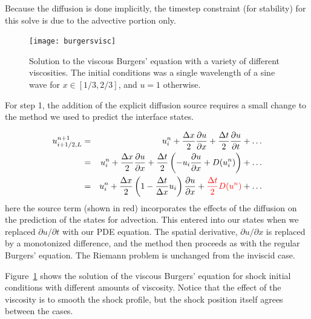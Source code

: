 Because the diffusion is done implicitly, the timestep constraint (for
stability) for this solve is due to the advective portion only.

\begin{figure}[t]
\centering
\texttt{[image: burgersvisc]}
\caption[Viscous Burgers' equation solution]
  {\label{fig:viscburger} Solution to the viscous Burgers' equation
  with a variety of different viscosities.  The initial conditions was
  a single wavelength of a sine wave for $x \in [1/3,2/3]$, and $u = 1$
  otherwise. \\
  }
\end{figure}

For step 1, the addition of the explicit diffusion source requires
a small change to the method we used to predict the interface states.

\begin{eqnarray}
u^{n+1}_{i+1/2,L} &=& u^n_i + \frac{\Delta x}{2} \frac{\partial u}{\partial x}
                        + \frac{\Delta t}{2} \frac{\partial u}{\partial t} + \ldots \\
                &=& u^n_i + \frac{\Delta x}{2} \frac{\partial u}{\partial x}
                        + \frac{\Delta t}{2} \left (-u_i \frac{\partial u}{\partial x} + D(u^n_i) \right ) + \ldots \\
                &=& u^n_i + \frac{\Delta x}{2} \left ( 1 - \frac{\Delta t}{\Delta x}u_i \right ) \frac{\partial u}{\partial x} + {\color{red} \frac{\Delta t}{2} D(u^n) } + \ldots
\end{eqnarray}
here the source term (shown in red) incorporates the effects of the
diffusion on the prediction of the states for advection.  This entered
into our states when we replaced $\partial u/\partial t$ with our PDE
equation.  The spatial derivative, $\partial u/\partial x$ is replaced
by a monotonized difference, and the method then proceeds as with the
regular Burgers' equation.  The Riemann problem is unchanged from the
inviscid case.

Figure~\ref{fig:viscburger} shows the solution of the viscous Burgers'
equation for shock initial conditions with different amounts of
viscosity.  Notice that the effect of the viscosity is to smooth the
shock profile, but the shock position itself agrees between the cases.


